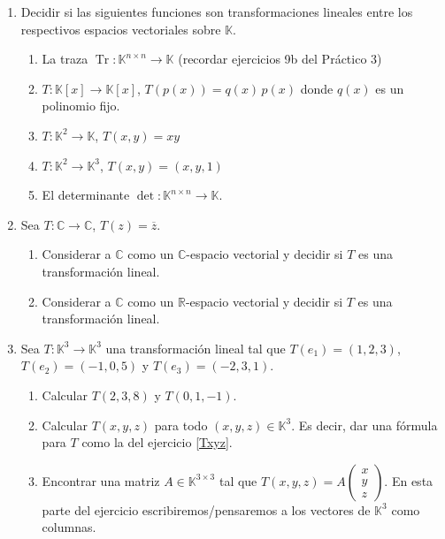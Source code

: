 \documentclass[a4paper,12pt,twoside,spanish,reqno]{amsbook}
\numberwithin{equation}{section}
\begin{document}
\begin{enumerate}[topsep=6pt, itemsep=.4cm]
\item Decidir si las siguientes funciones son transformaciones lineales entre los respectivos espacios vectoriales sobre $\mathbb{K}$.
\begin{enumerate}[resume, topsep=5pt,itemsep=5pt]
 \item La traza $\operatorname{Tr}:\mathbb{K}^{n\times n}\longrightarrow\mathbb{K}$ (recordar ejercicios 9b del Práctico 3) 
 \item $T:\mathbb{K}[x]\longrightarrow\mathbb{K}[x]$, $T(p(x))=q(x)\,p(x)$ donde $q(x)$ es un polinomio fijo.
 \item $T:\mathbb{K}^2\longrightarrow\mathbb{K}$, $T(x,y)=xy$
 \item $T:\mathbb{K}^2\longrightarrow\mathbb{K}^3$, $T(x,y)=(x,y,1)$
 \item El determinante $\operatorname{det}:\mathbb{K}^{n\times n}\longrightarrow\mathbb{K}$.
\end{enumerate}


\item Sea $T:\mathbb{C}\longrightarrow\mathbb{C}$, $T(z)=\overline{z}$.
\begin{enumerate}
 \item Considerar a $\mathbb{C}$ como un $\mathbb{C}$-espacio vectorial y decidir si $T$ es una transformación lineal.
 \item Considerar a $\mathbb{C}$ como un $\mathbb{R}$-espacio vectorial y decidir si $T$ es una transformación lineal.
\end{enumerate}


\item\label{T en la base} Sea $T:\mathbb{K}^3\longrightarrow\mathbb{K}^3$ una transformación lineal tal que $T(e_1)=(1,2,3)$, $T(e_2)=(-1,0,5)$ y $T(e_3)=(-2,3,1)$. 
    \begin{enumerate}
     \item Calcular $T(2,3,8)$ y $T(0,1,-1)$. 
     \item\label{T en la base b} Calcular $T(x,y,z)$ para todo $(x,y,z)\in\mathbb{K}^3$. Es decir, dar una fórmula para $T$ como la del ejercicio     \ref{Txyz}.
     \item\label{matriz otro}  Encontrar una matriz $A\in\mathbb{K}^{3\times3}$ tal que
     $T(x,y,z)=A\left(\begin{matrix}
    x\\y\\z \end{matrix}
    \right)$. En esta parte del ejercicio escribiremos/pensaremos a los vectores de $\mathbb{K}^3$ como columnas.
    \end{enumerate}


\end{enumerate}
\end{document}
